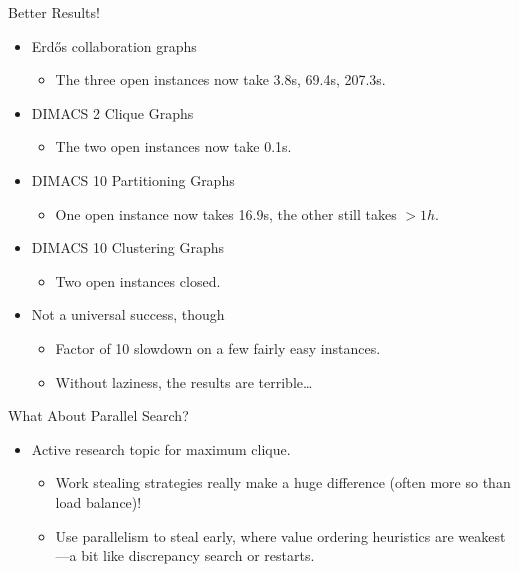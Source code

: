\documentclass{beamer}
\begin{document}
\begin{frame}{Better Results!}
    \begin{itemize}
        \item Erd\H{o}s collaboration graphs
            \begin{itemize}
                \item The three open instances now take 3.8s, 69.4s, 207.3s.
            \end{itemize}

        \item DIMACS 2 Clique Graphs
            \begin{itemize}
                \item The two open instances now take 0.1s.
            \end{itemize}

        \item DIMACS 10 Partitioning Graphs
            \begin{itemize}
                \item One open instance now takes 16.9s, the other still takes $>1h$.
            \end{itemize}

        \item DIMACS 10 Clustering Graphs
            \begin{itemize}
                \item Two open instances closed.
            \end{itemize}

        \item Not a universal success, though
            \begin{itemize}
                \item Factor of 10 slowdown on a few fairly easy instances.
                \item Without laziness, the results are terrible\ldots
            \end{itemize}
    \end{itemize}
\end{frame}

\begin{frame}{What About Parallel Search?}

    \begin{itemize}
        \item Active research topic for maximum clique.
            \begin{itemize}
                \item Work stealing strategies really make a huge difference (often more so than
                    load balance)!
                \item Use parallelism to steal early, where value ordering heuristics are
                    weakest---a bit like discrepancy search or restarts.
            \end{itemize}
    \end{itemize}
\end{frame}
\end{document}
